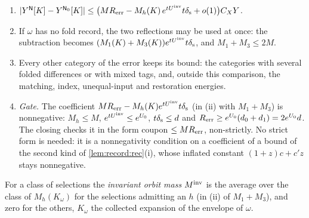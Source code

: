 \begin{lemma}
\begin{enumerate}[label=(\roman*)]
\item $|Y^{\mathsf N}[K]-Y^{\mathsf N_0}[K]|\le\bigl(MR_{\rm err}-M_h(K)\,e^{tU^{\mathrm{inv}}}t\delta_{\rm s}+o(1)\bigr)
 C_XY$.
\item If $\omega$ has no fold record, the two reflections may be used at once:
 the subtraction becomes $(M_1(K)+M_3(K))e^{tU^{\mathrm{inv}}}t\delta_{\rm s}$, and $M_1+M_3\le2M$.
\item Every other category of the error keeps its bound: the categories with
 several folded differences or with mixed tags, and, outside this comparison, the
 matching, index, unequal-input and restoration energies.
\item \emph{Gate.} The coefficient $MR_{\rm err}-M_h(K)e^{tU^{\mathrm{inv}}}t\delta_{\rm s}$ (in (ii) with
 $M_1+M_3$) is nonnegative: $M_h\le M$, $e^{tU^{\mathrm{inv}}}\le e^{U_0}$, $t\delta_{\rm s}\le d$ and
 $R_{\rm err}\ge e^{U_0}(d_0+d_1)=2e^{U_0}d$. The closing checks it in the form
 coupon $\le MR_{\rm err}$, non-strictly. No strict form is needed: it is a
 nonnegativity condition on a coefficient of a bound of the second kind of
 \cref{lem:record:rec}(i), whose inflated constant $(1+z)c+c'z$ stays nonnegative.
\end{enumerate}
For a class of selections the \emph{invariant orbit mass} $M^{\rm inv}$ is the average
over the class of $M_h(K_\omega)$ for the selections admitting an $h$ (in (ii) of
$M_1+M_3$), and zero for the others, $K_\omega$ the collected expansion of the
envelope of $\omega$.
\end{lemma}

